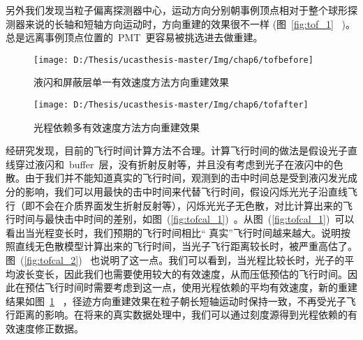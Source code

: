 另外我们发现当粒子偏离探测器中心，运动方向分别朝事例顶点相对于整个球形探测器来说的长轴和短轴方向运动时，方向重建的效果很不一样 (图~\ref{fig:tof_1}~ )。 总是远离事例顶点位置的~PMT~更容易被挑选进去做重建。
\begin{figure}[!htbp]
\begin{minipage}[t]{0.48\linewidth}
  \centering
     \texttt{[image: D:/Thesis/ucasthesis-master/Img/chap6/tofbefore]}
    \caption{液闪和屏蔽层单一有效速度方法方向重建效果}
    \label{fig:tof_1}
  \end{minipage}%
  \quad\quad
  \begin{minipage}[t]{0.48\linewidth}
  \centering
    \texttt{[image: D:/Thesis/ucasthesis-master/Img/chap6/tofafter]}
    \caption{光程依赖多有效速度方法方向重建效果}
    \label{fig:tof_2}
  \end{minipage}
  \end{figure}
经研究发现，目前的飞行时间计算方法不合理。计算飞行时间的做法是假设光子直线穿过液闪和~buffer~层，没有折射反射等，并且没有考虑到光子在液闪中的色散。由于我们并不能知道真实的飞行时间，观测到的击中时间总是受到液闪发光成分的影响，我们可以用最快的击中时间来代替飞行时间，假设闪烁光光子沿直线飞行（即不会在介质界面发生折射反射等），闪烁光光子无色散，对比计算出来的飞行时间与最快击中时间的差别，如图~(\ref{fig:tofcal_1})~。从图~(\ref{fig:tofcal_1})~可以看出当光程变长时，我们预期的飞行时间相比`` 真实''飞行时间越来越大。说明按照直线无色散模型计算出来的飞行时间，当光子飞行距离较长时，被严重高估了。图~(\ref{fig:tofcal_2})~ 也说明了这一点。我们可以看到，当光程比较长时，光子的平均波长变长，因此我们也需要使用较大的有效速度，从而压低预估的飞行时间。因此在预估飞行时间时需要考虑到这一点，使用光程依赖的平均有效速度，新的重建结果如图~\ref{fig:tof_2}~ ，径迹方向重建效果在粒子朝长短轴运动时保持一致，不再受光子飞行距离的影响。在将来的真实数据处理中，我们可以通过刻度源得到光程依赖的有效速度修正数据。
